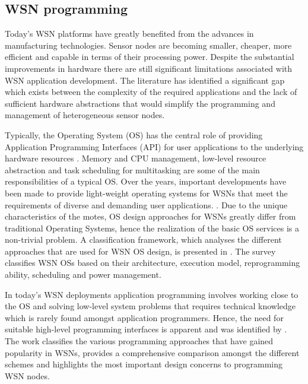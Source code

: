\subsection{WSN programming}
Today's WSN platforms have greatly benefited from the advances in manufacturing technologies.  Sensor nodes are becoming smaller, cheaper, more efficient and capable in terms of their processing power. Despite the substantial improvements in hardware there are still significant limitations associated with WSN application development. The literature has identified a significant gap \cite{Fok:2009:AMA:1552297.1552299,Levis:2002:MTV:635506.605407,Costa:2007:VMA:1304610.1306527,1621014} which exists between the complexity of the required applications and the lack of sufficient hardware abstractions that would simplify the programming and management of heterogeneous sensor nodes. 

Typically, the Operating System (OS) has the central role of providing Application Programming Interfaces (API) for user applications to the underlying hardware resources \cite{hailperin2007operating,Stallings:1998:OSI:272982}. Memory and CPU management, low-level resource abstraction and task scheduling for multitasking are some of the main responsibilities of a typical OS. Over the years, important developments have been made to provide light-weight operating systems for WSNs that meet the requirements of diverse and demanding user applications. \cite{1367266,1630599,bhatti2005mantis,eswaran2005nano,s110605900}.
Due to the unique characteristics of the motes, OS design approaches for WSNs greatly differ from traditional Operating Systems, hence the realization of the basic OS services is a non-trivial problem. A classification framework, which analyses the different approaches that are used for WSN OS design, is presented in \cite{Reddy:2009:WSN:1593545.1593549}. The survey classifies WSN OSs based on their architecture, execution model, reprogramming ability, scheduling and power management. 

In today's WSN deployments application programming involves working close to the OS and solving low-level system problems that requires technical knowledge which is rarely found amongst application programmers. Hence, the need for suitable high-level programming interfaces is apparent and was identified by \cite{mottola2011programming}. The work classifies the various programming approaches that have gained popularity in WSNs, provides a comprehensive comparison amongst the different schemes and highlights the most important design concerns to programming WSN nodes. 

